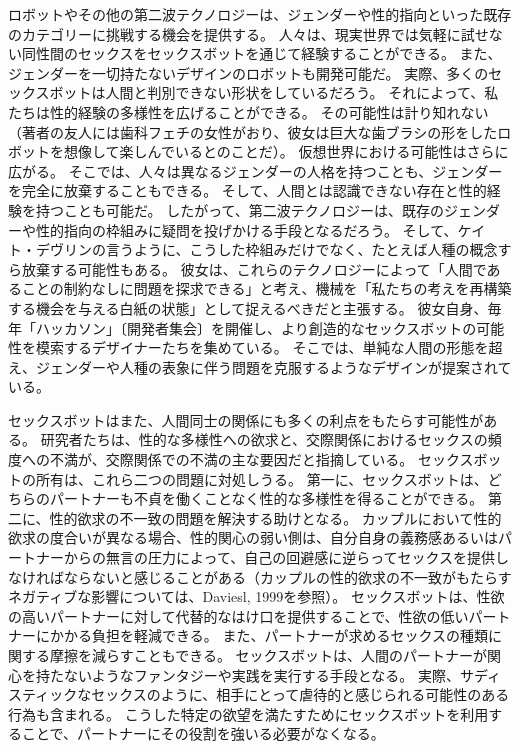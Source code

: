 \documentclass[paper=a4,book,openany]{jlreq} \usepackage{mystyle}
\begin{document}
ロボットやその他の第二波テクノロジーは、ジェンダーや性的指向といった既存のカテゴリーに挑戦する機会を提供する。
人々は、現実世界では気軽に試せない同性間のセックスをセックスボットを通じて経験することができる。
また、ジェンダーを一切持たないデザインのロボットも開発可能だ。
実際、多くのセックスボットは人間と判別できない形状をしているだろう。
それによって、私たちは性的経験の多様性を広げることができる。
その可能性は計り知れない（著者の友人には歯科フェチの女性がおり、彼女は巨大な歯ブラシの形をしたロボットを想像して楽しんでいるとのことだ）。
仮想世界における可能性はさらに広がる。
そこでは、人々は異なるジェンダーの人格を持つことも、ジェンダーを完全に放棄することもできる。
そして、人間とは認識できない存在と性的経験を持つことも可能だ。
したがって、第二波テクノロジーは、既存のジェンダーや性的指向の枠組みに疑問を投げかける手段となるだろう。
そして、ケイト・デヴリンの言うように、こうした枠組みだけでなく、たとえば人種の概念すら放棄する可能性もある。
彼女は、これらのテクノロジーによって「人間であることの制約なしに問題を探求できる」と考え、機械を「私たちの考えを再構築する機会を与える白紙の状態」として捉えるべきだと主張する\citep{devlin15:_in_defen_sex_machin}。
彼女自身、毎年「ハッカソン」〔開発者集会〕を開催し、より創造的なセックスボットの可能性を模索するデザイナーたちを集めている。
そこでは、単純な人間の形態を超え、ジェンダーや人種の表象に伴う問題を克服するようなデザインが提案されている。

セックスボットはまた、人間同士の関係にも多くの利点をもたらす可能性がある。
研究者たちは、性的な多様性への欲求と、交際関係におけるセックスの頻度への不満が、交際関係での不満の主な要因だと指摘している\citep[p.274]{selterman19:_motiv_extrad_infid_revis}。
セックスボットの所有は、これら二つの問題に対処しうる。
第一に、セックスボットは、どちらのパートナーも不貞を働くことなく性的な多様性を得ることができる。
第二に、性的欲求の不一致の問題を解決する助けとなる。
カップルにおいて性的欲求の度合いが異なる場合、性的関心の弱い側は、自分自身の義務感あるいはパートナーからの無言の圧力によって、自己の回避感に逆らってセックスを提供しなければならないと感じることがある（カップルの性的欲求の不一致がもたらすネガティブな影響については、Daviesl, 1999を参照）\nocite{davies99:_sexual_desir_discr}。
セックスボットは、性欲の高いパートナーに対して代替的なはけ口を提供することで、性欲の低いパートナーにかかる負担を軽減できる。
また、パートナーが求めるセックスの種類に関する摩擦を減らすこともできる。
セックスボットは、人間のパートナーが関心を持たないようなファンタジーや実践を実行する手段となる。
実際、サディスティックなセックスのように、相手にとって虐待的と感じられる可能性のある行為も含まれる。
こうした特定の欲望を満たすためにセックスボットを利用することで、パートナーにその役割を強いる必要がなくなる。
\end{document}
